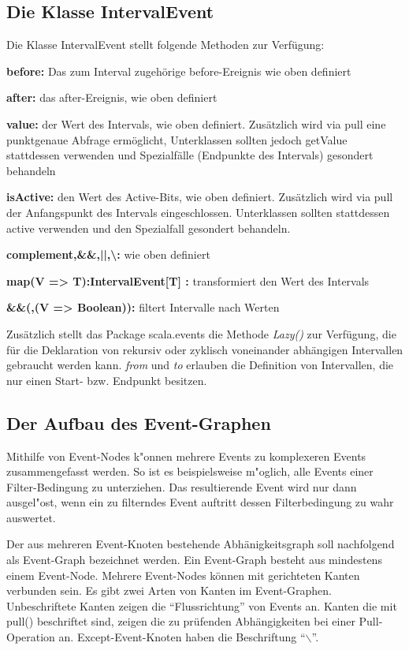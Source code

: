 \subsection{Die Klasse IntervalEvent}
Die Klasse IntervalEvent stellt folgende Methoden zur Verfügung:

\begin{description}
\item{\bf before: } Das zum Interval zugehörige before-Ereignis wie oben definiert
\item{\bf after: } das after-Ereignis, wie oben definiert
\item{\bf value: } der Wert des Intervals, wie oben definiert. Zusätzlich wird via pull eine punktgenaue Abfrage ermöglicht,
Unterklassen sollten jedoch getValue stattdessen verwenden und Spezialfälle (Endpunkte des Intervals) gesondert behandeln
\item{\bf isActive: } den Wert des Active-Bits, wie oben definiert. Zusätzlich wird via pull der Anfangspunkt des Intervals eingeschlossen. Unterklassen sollten stattdessen active verwenden und den Spezialfall gesondert behandeln.
\item{\bf complement,\&\&,||,\textbackslash: } wie oben definiert
\item{\bf map(V => T):IntervalEvent[T] : } transformiert den Wert des Intervals
\item{\bf \&\&(,(V => Boolean)): } filtert Intervalle nach Werten
\end{description}

Zusätzlich stellt das Package scala.events die Methode \textit{Lazy(\Interval{})} zur Verfügung, die für die Deklaration von rekursiv oder zyklisch voneinander abhängigen Intervallen gebraucht werden kann. \textit{from} und \textit{to} erlauben die Definition von Intervallen, die nur einen Start- bzw. Endpunkt besitzen.

\subsection{Der Aufbau des Event-Graphen}
Mithilfe von Event-Nodes k"onnen mehrere Events zu komplexeren Events
zusammengefasst werden. So ist es beispielsweise m"oglich, alle Events einer
Filter-Bedingung zu unterziehen. Das resultierende Event wird nur dann
ausgel"ost, wenn ein zu filterndes Event auftritt dessen Filterbedingung zu
wahr auswertet. 

Der aus mehreren Event-Knoten bestehende Abhänigkeitsgraph soll nachfolgend als
Event-Graph bezeichnet werden. Ein Event-Graph besteht aus mindestens einem
Event-Node. Mehrere Event-Nodes können mit gerichteten Kanten verbunden sein. 
Es gibt zwei Arten von Kanten im Event-Graphen. Unbeschriftete Kanten zeigen 
die ``Flussrichtung'' von Events an. Kanten die mit pull() beschriftet sind, 
zeigen die zu prüfenden Abhängigkeiten bei einer Pull-Operation an. 
Except-Event-Knoten haben die Beschriftung ``$\backslash$''.

